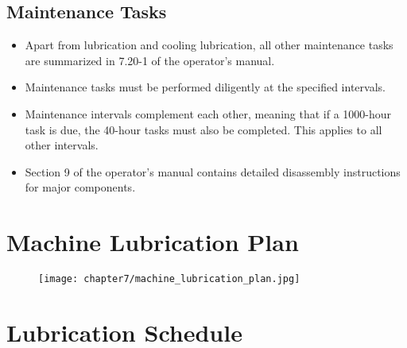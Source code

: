 \subsection*{Maintenance Tasks}
\begin{itemize}
    \item Apart from lubrication and cooling lubrication, all other maintenance tasks are summarized in 7.20-1 of the operator’s manual.
    \item Maintenance tasks must be performed diligently at the specified intervals.
    \item Maintenance intervals complement each other, meaning that if a 1000-hour task is due, the 40-hour tasks must also be completed. This applies to all other intervals.
    \item Section 9 of the operator's manual contains detailed disassembly instructions for major components.
\end{itemize}


\section{Machine Lubrication Plan}

\begin{figure}[H]
    \centering
    \texttt{[image: chapter7/machine\_lubrication\_plan.jpg]}
\end{figure}

\section{Lubrication Schedule}


